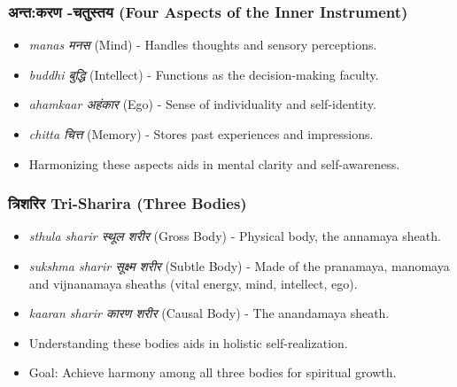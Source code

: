 \begin{frame}[fragile]\frametitle{अन्त:करण -चतुस्तय  (Four Aspects of the Inner Instrument)}

      \begin{itemize}
		\item \textit{manas मनस } (Mind) - Handles thoughts and sensory perceptions.
		\item \textit{buddhi बुद्धि } (Intellect) - Functions as the decision-making faculty.
		\item \textit{ahamkaar अहंकार } (Ego) - Sense of individuality and self-identity.
		\item \textit{chitta चित्त } (Memory) - Stores past experiences and impressions.
		\item Harmonizing these aspects aids in mental clarity and self-awareness.
	  \end{itemize}

\end{frame}

\begin{frame}[fragile]\frametitle{त्रिशरिर  Tri-Sharira (Three Bodies)}

      \begin{itemize}
		\item \textit{sthula sharir स्थूल  शरीर } (Gross Body) - Physical body, the annamaya sheath.
		\item \textit{sukshma sharir सूक्ष्म  शरीर } (Subtle Body) - Made of the pranamaya, manomaya and vijnanamaya sheaths (vital energy, mind, intellect, ego).
		\item \textit{kaaran sharir कारण  शरीर } (Causal Body) - The anandamaya sheath.
		\item Understanding these bodies aids in holistic self-realization.
		\item Goal: Achieve harmony among all three bodies for spiritual growth.
	  \end{itemize}

\end{frame}

